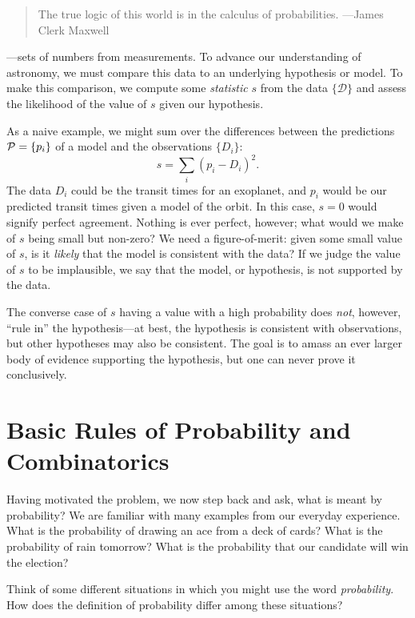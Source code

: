 
\begin{quote}The true logic of this world is  in the calculus of probabilities. ---James Clerk Maxwell\end{quote}

---sets of numbers from measurements. To advance our understanding of astronomy, we must compare this data to an underlying hypothesis or model.  To make this comparison, we compute some \emph{statistic} $s$ from the data $\{\mathcal{D}\}$ and assess the likelihood of the value of $s$ given our hypothesis.

As a naive example, we might sum over the differences between the predictions $\mathcal{P} = \{p_{i}\}$ of a model and the observations $\{D_{i}\}$:
\[ s = \sum_{i} \left(p_{i}-D_{i}\right)^{2}. \]
The data $D_{i}$ could be the transit times for an exoplanet, and $p_{i}$ would be our predicted transit times given a model of the orbit.
In this case, $s=0$ would signify perfect agreement. Nothing is ever perfect, however; what would we make of $s$ being small but non-zero?  We need a figure-of-merit: given some small value of $s$, is it \emph{likely} that the model is consistent with the data?  If we judge the value of $s$ to be implausible, we say that the model, or hypothesis, is not supported by the data.  

The converse case of $s$ having a value with a high probability does \emph{not}, however, ``rule in'' the hypothesis---at best, the hypothesis is consistent with observations, but other hypotheses may also be consistent. The goal is to amass an ever larger body of evidence supporting the hypothesis, but one can never prove it conclusively.

\section{Basic Rules of Probability and Combinatorics}

Having motivated the problem, we now step back and ask, what is meant by probability? We are familiar with many examples from our everyday experience. What is the probability of drawing an ace from a deck of cards? What is the probability of rain tomorrow? What is the probability that our candidate will win the election?

\begin{exercisebox}
Think of some different situations in which you might use the word \emph{probability}.  How does the definition of probability differ among these situations?
\end{exercisebox}


